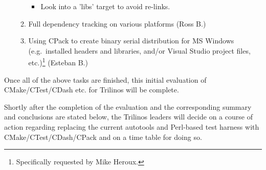 \documentclass[pdf,ps2pdf,11pt]{SANDreport}
\begin{document}
\begin{enumerate}
\begin{enumerate}
\begin{itemize}
    {}\item Look into a 'libs' target to avoid re-links.

    \end{itemize}

  {}\item Full dependency tracking on various platforms (Ross B.)

  {}\item Using CPack to create binary serial distribution for MS
  Windows (e.g.\ installed headers and libraries, and/or Visual Studio
  project files, etc.)\footnote{Specifically requested by Mike
  Heroux.} (Esteban B.)

  \end{enumerate}

\end{enumerate}

Once all of the above tasks are finished, this initial evaluation of
CMake/CTest/CDash etc. for Trilinos will be complete.

Shortly after the completion of the evaluation and the corresponding
summary and conclusions are stated below, the Trilinos leaders will
decide on a course of action regarding replacing the current autotools
and Perl-based test harness with CMake/CTest/CDash/CPack and on a time
table for doing so.


\begin{SANDdistribution}[NM]
\end{SANDdistribution}
\end{document}

